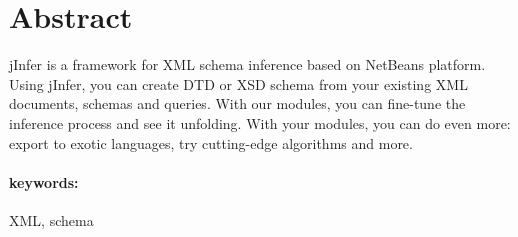 \section*{Abstract}

jInfer is a framework for XML schema inference based on NetBeans platform.
Using jInfer, you can create DTD or XSD schema from your existing XML documents, schemas and queries.
With our modules, you can fine-tune the inference process and see it unfolding.
With your modules, you can do even more: export to exotic languages, try cutting-edge algorithms and more. 

\paragraph{keywords:} XML, schema

